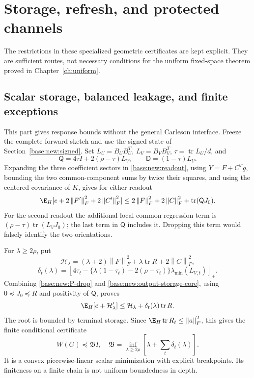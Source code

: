 \documentclass[11pt,oneside,openany,a4paper]{book}
\numberwithin{equation}{chapter}
\theoremstyle{definition}
\theoremstyle{remark}
\newcommand{\F}[1]{\left\lVert#1\right\rVert_F}
\DeclareMathOperator{\tr}{tr}\DeclareMathOperator{\rank}{rank}
\begin{document}
\chapter{Storage, refresh, and protected channels}\label{ch:geometry}
\begin{scopebox}
The restrictions in these specialized geometric certificates are kept explicit. They are sufficient routes, not necessary conditions for the uniform fixed-space theorem proved in Chapter~\ref{ch:uniform}.
\end{scopebox}
\section{Scalar storage, balanced leakage, and finite exceptions}\label{base:new:scalar-storage}
This part gives response bounds without the general Carleson interface. Freeze the complete forward sketch and use the signed state of Section~\ref{base:new:signed}. Set $L_U=B_UB_U^T$, $L_V=B_VB_V^T$, $\tau=\tr L_U/d$, and
\[
 \mathsf Q=4\tau I+2(\rho-\tau)L_V,\qquad
 \mathsf D=(1-\tau)L_V.
\]
Expanding the three coefficient sectors in \eqref{base:new:readout}, using $Y=F+C^Tg$, bounding the two common-component sums by twice their squares, and using the centered covariance of $K$, gives for either readout
\begin{equation}\label{base:new:output-storage-core}
 \E_H[e+2\F{F'}^2+2\F{C'}^2]
 \le2\F F^2+2\F C^2+\tr(\mathsf QJ_0).
\end{equation}
For the second readout the additional local common-regression term is
$(\rho-\tau)\tr(L_VJ_0)$; the last term in $\mathsf Q$ includes it. Dropping this term would falsely identify the two orientations.

For $\lambda\ge2\rho$, put
\[
 \mathcal H_\lambda=(\lambda+2)\F F^2+\lambda\tr R+2\F C^2,
\]
\[
 \delta_t(\lambda)=\left[4\tau_t-
 \{\lambda(1-\tau_t)-2(\rho-\tau_t)\}\lambda_{\min}(L_{V,t})\right]_+.
\]
Combining \eqref{base:new:P-drop} and \eqref{base:new:output-storage-core}, using $0\preceq J_0\preceq R$ and positivity of $\mathsf Q$, proves
\begin{equation}\label{base:new:scalar-storage-ineq}
 \E_H[e+\mathcal H_\lambda']\le\mathcal H_\lambda+
 \delta_t(\lambda)\tr R.
\end{equation}
The root is bounded by terminal storage. Since $\E_H\tr R_t\le\F a^2$, this gives the finite conditional certificate
\begin{equation}\label{base:new:defect-profile}
 W(G)\preceq\mathfrak B I,
 \quad\mathfrak B=\inf_{\lambda\ge2\rho}
 \left[\lambda+\sum_t\delta_t(\lambda)\right].
\end{equation}
It is a convex piecewise-linear scalar minimization with explicit breakpoints. Its finiteness on a finite chain is not uniform boundedness in depth.
\end{document}

